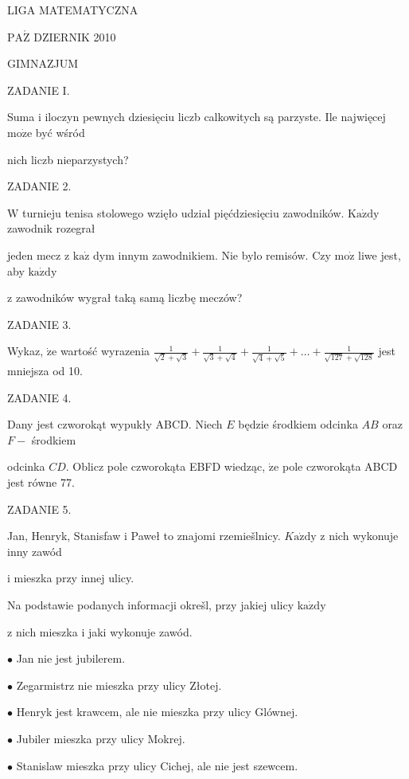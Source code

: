 \documentclass[a4paper,12pt]{article}
\begin{document}
LIGA MATEMATYCZNA

$\mathrm{P}\mathrm{A}\acute{\mathrm{Z}}$ DZIERNIK 2010

GIMNAZJUM

ZADANIE I.

Suma i iloczyn pewnych dziesięciu liczb calkowitych są parzyste. Ile najwięcej $\mathrm{m}\mathrm{o}\dot{\mathrm{z}}\mathrm{e}$ być wśród

nich liczb nieparzystych?

ZADANIE 2.

$\mathrm{W}$ turnieju tenisa stolowego wzięło udzial pięćdziesięciu zawodników. $\mathrm{K}\mathrm{a}\dot{\mathrm{z}}\mathrm{d}\mathrm{y}$ zawodnik rozegrał

jeden mecz z $\mathrm{k}\mathrm{a}\dot{\mathrm{z}}$ dym innym zawodnikiem. Nie bylo remisów. Czy $\mathrm{m}\mathrm{o}\dot{\mathrm{z}}$ liwe jest, aby $\mathrm{k}\mathrm{a}\dot{\mathrm{z}}\mathrm{d}\mathrm{y}$

z zawodników wygrał taką samą liczbę meczów?

ZADANIE 3.

Wykaz, $\dot{\mathrm{z}}\mathrm{e}$ wartość wyrazenia $\displaystyle \frac{1}{\sqrt{2}+\sqrt{3}}+\frac{1}{\sqrt{3}+\sqrt{4}}+\frac{1}{\sqrt{4}+\sqrt{5}}+\ldots+\frac{1}{\sqrt{127}+\sqrt{128}}$ jest mniejsza od 10.

ZADANIE 4.

Dany jest czworokąt wypukły ABCD. Niech $E$ będzie środkiem odcinka $AB$ oraz $F-$ środkiem

odcinka $CD$. Oblicz pole czworokąta EBFD wiedząc, $\dot{\mathrm{z}}\mathrm{e}$ pole czworokąta ABCD jest równe 77.

ZADANIE 5.

Jan, Henryk, Stanisfaw i Paweł to znajomi rzemiešlnicy. $K\mathrm{a}\dot{\mathrm{z}}\mathrm{d}\mathrm{y}$ z nich wykonuje inny zawód

i mieszka przy innej ulicy.

Na podstawie podanych informacji okrešl, przy jakiej ulicy $\mathrm{k}\mathrm{a}\dot{\mathrm{z}}\mathrm{d}\mathrm{y}$

z nich mieszka i jaki wykonuje zawód.

$\bullet$ Jan nie jest jubilerem.

$\bullet$ Zegarmistrz nie mieszka przy ulicy Złotej.

$\bullet$ Henryk jest krawcem, ale nie mieszka przy ulicy Glównej.

$\bullet$ Jubiler mieszka przy ulicy Mokrej.

$\bullet$ Stanislaw mieszka przy ulicy Cichej, ale nie jest szewcem.
\end{document}
